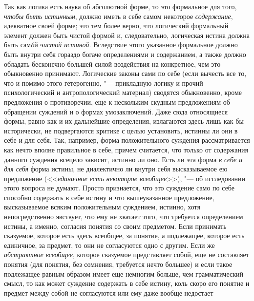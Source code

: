 Так как логика есть наука об абсолютной форме, то это
формальное для того, {\em чтобы быть
истинным}, должно иметь в себе самом некоторое {\em содержание},
адекватное своей форме; это тем более верно, что логический
формальный элемент должен быть чистой формой и, следовательно, логическая
истина должна быть самóй {\em чистой
истиной}. Вследствие этого указанное формальное должно быть
внутри себя гораздо богаче определениями и содержанием, а также должно
обладать бесконечно большей силой воздействия на конкретное, чем это
обыкновенно принимают.
Логические законы сами по себе (если вычесть все то, что и
помимо этого гетерогенно, "--- прикладную логику и прочий
психологический и антропологический материал) сводятся обыкновенно, кроме
предложения о противоречии, еще к нескольким скудным предложениям об
обращении суждений и о формах умозаключений. Даже сюда относящиеся формы,
равно как и их дальнейшие определения, излагаются здесь лишь как бы
исторически, не подвергаются критике с целью установить, истинны ли они в
себе и для себя. Так, например, форма положительного суждения
рассматривается как нечто вполне правильное в себе, причем
считается, что только от содержания данного суждения всецело зависит,
истинно ли оно. Есть ли эта форма {\em в
себе и для себя} форма истины, не диалектично ли внутри себя
высказываемое ею предложение (<<{\em единичное есть некоторое
всеобщее}>>), "--- об исследовании этого вопроса не думают. Просто
признается, что это суждение само по себе способно содержать в
себе истину и что вышеуказанное предложение, высказываемое всяким
положительным суждением, истинно, хотя непосредственно явствует, что ему не
хватает того, что требуется определением истины, а именно, согласия понятия
со своим предметом. Если принимать сказуемое, которое есть здесь всеобщее,
за понятие, а подлежащее, которое есть единичное, за предмет, то они не
согласуются одно с другим. Если же {\em абстрактное всеобщее},
которое сказуемое представляет собой, еще не составляет
понятия (для понятия, без сомнения, требуется нечто большее) и если такое
подлежащее равным образом имеет еще немногим больше, чем грамматический
смысл, то как может суждение содержать в себе истину, коль скоро его
понятие и предмет между собой не согласуются или ему даже вообще недостает
